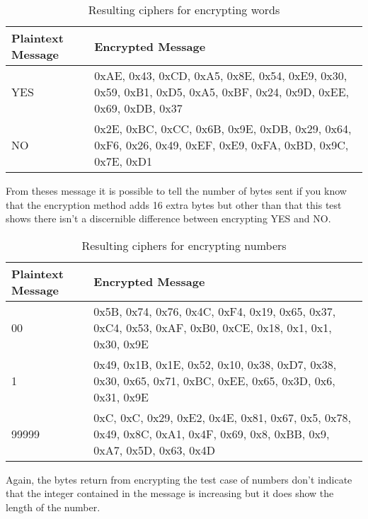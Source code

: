\begin{table}[H]
	\centering
	\begin{tabular}{ | l | p{7cm} | }
	\hline
	Plaintext Message & Encrypted Message \\ \hline
	YES & 0xAE, 0x43, 0xCD, 0xA5, 0x8E, 0x54, 0xE9,  0x30, 0x59, 0xB1, 0xD5, 0xA5, 0xBF, 0x24, 0x9D, 0xEE, 0x69, 0xDB, 0x37  \\ \hline
	NO &  0x2E, 0xBC, 0xCC, 0x6B, 0x9E, 0xDB, 0x29, 0x64, 0xF6, 0x26, 0x49, 0xEF, 0xE9, 0xFA, 0xBD, 0x9C, 0x7E, 0xD1 \\ \hline
	\end{tabular}
	\caption{Resulting ciphers for encrypting words}
	\label{tab:yesno}
\end{table}

From theses message it is possible to tell the number of bytes sent if you know that the encryption method adds 16 extra bytes but other than that this test shows there isn't a discernible difference between encrypting YES and NO.

\begin{table}[H]
	\centering
	\begin{tabular}{ | l | p{7cm} | }
	\hline
	Plaintext Message & Encrypted Message \\ \hline
	00 & 0x5B, 0x74, 0x76, 0x4C, 0xF4, 0x19, 0x65, 0x37, 0xC4, 0x53, 0xAF, 0xB0, 0xCE, 0x18, 0x1, 0x1, 0x30, 0x9E \\ \hline
	1 & 0x49, 0x1B, 0x1E, 0x52, 0x10, 0x38, 0xD7, 0x38, 0x30, 0x65, 0x71, 0xBC, 0xEE, 0x65, 0x3D, 0x6, 0x31, 0x9E\\ \hline
	99999 & 0xC, 0xC, 0x29, 0xE2, 0x4E, 0x81, 0x67, 0x5, 0x78, 0x49, 0x8C, 0xA1, 0x4F, 0x69, 0x8, 0xBB, 0x9, 0xA7, 0x5D, 0x63, 0x4D \\ \hline
	\end{tabular}
	\caption{Resulting ciphers for encrypting numbers}
	\label{tab:9999}
\end{table}

Again, the bytes return from encrypting the test case of numbers don't indicate that the integer contained in the message is increasing but it does show the length of the number.




